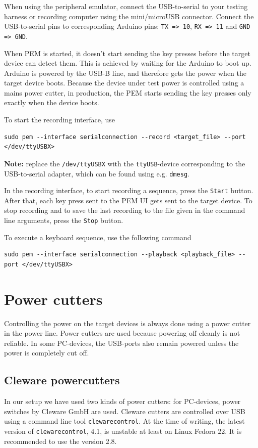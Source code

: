\documentclass[a4paper,11pt]{article}
\newcommand{\note}{\textbf{Note: }}
\newcommand{\cmd}[1]{\texttt{#1}}
\begin{document}
When using the peripheral emulator, connect the USB-to-serial to your testing harness or recording computer using the mini/microUSB connector. Connect the USB-to-serial pins to corresponding Arduino pins: \cmd{TX => 10}, \cmd{RX => 11} and \cmd{GND => GND}.

When PEM is started, it doesn't start sending the key presses before the target device can detect them. This is achieved by waiting for the Arduino to boot up. Arduino is powered by the USB-B line, and therefore gets the power when the target device boots. Because the device under test power is controlled using a mains power cutter, in production, the PEM starts sending the key presses only exactly when the device boots.

To start the recording interface, use
\begin{lstlisting}
sudo pem --interface serialconnection --record <target_file> --port </dev/ttyUSBX>
\end{lstlisting}
\note replace the \cmd{/dev/ttyUSBX} with the \cmd{ttyUSB}-device corresponding to the USB-to-serial adapter, which can be found using e.g. \cmd{dmesg}.

In the recording interface, to start recording a sequence, press the \cmd{Start} button. After that, each key press sent to the PEM UI gets sent to the target device. To stop recording and to save the last recording to the file given in the command line arguments, press the  \cmd{Stop} button.

To execute a keyboard sequence, use the following command
\begin{lstlisting}
sudo pem --interface serialconnection --playback <playback_file> --port </dev/ttyUSBX>
\end{lstlisting}

\pagebreak

\section{Power cutters}
\label{powercutters}
Controlling the power on the target devices is always done using a power cutter in the power line. Power cutters are used because powering off cleanly is not reliable. In some PC-devices, the USB-ports also remain powered unless the power is completely cut off.

\subsection{Cleware powercutters}
\label{clewarecutters}
In our setup we have used two kinds of power cutters: for PC-devices, power switches by Cleware GmbH are used. Cleware cutters are controlled over USB using a command line tool \cmd{clewarecontrol}. At the time of writing, the latest version of \cmd{clewarecontrol}, 4.1, is unstable at least on Linux Fedora 22. It is recommended to use the version 2.8.
\end{document}
